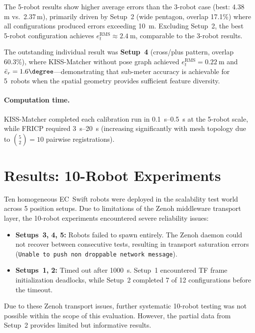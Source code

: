 The 5-robot results show higher average errors than the 3-robot case
(best: 4.38\,m vs.\ 2.37\,m), primarily driven by Setup~2 (wide
pentagon, overlap 17.1\%) where all configurations produced errors
exceeding \SI{10}{\metre}.
Excluding Setup~2, the best 5-robot configuration achieves
$e_t^\mathrm{RMS} \approx \SI{2.4}{\metre}$, comparable to the
3-robot results.

The outstanding individual result was \textbf{Setup~4}
(cross/plus pattern, overlap 60.3\%), where KISS-Matcher without
pose graph achieved $e_t^\mathrm{RMS} = \SI{0.22}{\metre}$ and
$\bar{e}_r = 1.6\degree$---demonstrating that sub-meter accuracy
is achievable for 5~robots when the spatial geometry provides
sufficient feature diversity.

\paragraph{Computation time.}
KISS-Matcher completed each calibration run in
\SIrange{0.1}{0.5}{\second} at the 5-robot scale, while FRICP
required \SIrange{3}{20}{\second} (increasing significantly with
mesh topology due to $\binom{5}{2} = 10$ pairwise registrations).

\section{Results: 10-Robot Experiments}
\label{sec:results_10robots}

Ten homogeneous EC~Swift robots were deployed in the scalability
test world across 5 position setups.
Due to limitations of the Zenoh middleware transport layer, the
10-robot experiments encountered severe reliability issues:
\begin{itemize}
    \item \textbf{Setups~3, 4, 5:} Robots failed to spawn entirely.
          The Zenoh daemon could not recover between consecutive
          tests, resulting in transport saturation errors
          (\texttt{Unable to push non droppable network message}).
    \item \textbf{Setups~1, 2:} Timed out after \SI{1000}{\second}.
          Setup~1 encountered TF frame initialization deadlocks, while
          Setup~2 completed 7 of 12 configurations before the timeout.
\end{itemize}

Due to these Zenoh transport issues, further systematic 10-robot
testing was not possible within the scope of this evaluation.
However, the partial data from Setup~2 provides limited but
informative results.

